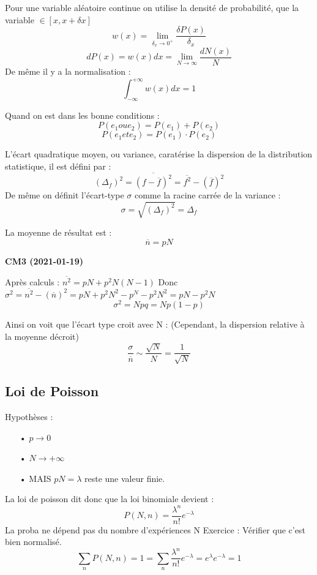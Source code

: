 \documentclass[12pt,a4paper]{report}
\begin{document}
Pour une variable aléatoire continue on utilise la densité de probabilité, que la variable \(\in [x, x +\delta x]\)
\[
	w(x) = \lim_{\delta_x \rightarrow 0^+} \frac{\delta P(x)}{\delta_x}
\]
\[
	dP(x) = w(x)dx = \lim_{N \rightarrow \infty} \frac{dN(x)}{N}
\]
De même il y a la normalisation :
\[
	\int_{-\infty}^{+\infty} w(x)dx = 1
\]

Quand on est dans les bonne conditions :
\[
	P(e_1 ou e_2) = P(e_1) + P(e_2)
\]
\[
	P(e_1 et e_2) = P(e_1)\cdot P(e_2)
\]

L'écart quadratique moyen, ou variance, caratérise la dispersion de la distribution statistique, il est défini par :
\[
	(\Delta_f)^2 = \overline{(f - \overline{f})^2} = \overline{f^2} - (\overline{f})^2
\]
De même on définit l'écart-type \(\sigma\) comme la racine carrée de la variance :
\[
	\sigma = \sqrt{(\Delta_f)^2} = \Delta_f
\]

La moyenne de résultat est :
\[
	\overline{n} = pN
\]

\begin{center}
\textbf{CM3 (2021-01-19)}
\end{center}

Après calculs : \(\overline{n^2} = pN + p^2N(N-1)\)
Donc \(\sigma^2 = \overline{n^2} - (\overline{n})^2 = pN + p^2N^2 - p^N - p^2N^2 = pN - p^2N\)
\[
	\sigma^2 = N p q = Np(1-p)
\]

Ainsi on voit que l'écart type croit avec N :
(Cependant, la dispersion relative à la moyenne décroit)
\[
	\dfrac{\sigma}{\overline{n}} \sim \dfrac{\sqrt{N}}{N} = \dfrac{1}{\sqrt{N}}
\]

\subsection{Loi de Poisson}

Hypothèses :
\begin{itemize}
	\item[•] \(p \rightarrow 0\)
	\item[•] \(N \rightarrow +\infty\)
	\item[•] MAIS \(pN = \lambda\) reste une valeur finie.
\end{itemize}

La loi de poisson dit donc que la loi binomiale devient :
\[
	P(N, n) = \dfrac{\lambda^n}{n!}e^{-\lambda}
\]
La proba ne dépend pas du nombre d'expériences N
Exercice : Vérifier que c'est bien normalisé.
\[
	\sum_n P(N,n) = 1 = \sum_n \dfrac{\lambda^n}{n!}e^{-\lambda} = e^\lambda e^{-\lambda} = 1
\]
\end{document}
